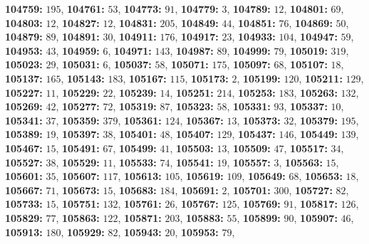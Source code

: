 \textsf{\bfseries 104759:} $195$, \textsf{\bfseries 104761:} $53$, \textsf{\bfseries 104773:} $91$, \textsf{\bfseries 104779:} $3$, \textsf{\bfseries 104789:} $12$, \textsf{\bfseries 104801:} $69$, \textsf{\bfseries 104803:} $12$, \textsf{\bfseries 104827:} $12$, \textsf{\bfseries 104831:} $205$, \textsf{\bfseries 104849:} $44$, \textsf{\bfseries 104851:} $76$, \textsf{\bfseries 104869:} $50$, \textsf{\bfseries 104879:} $89$, \textsf{\bfseries 104891:} $30$, \textsf{\bfseries 104911:} $176$, \textsf{\bfseries 104917:} $23$, \textsf{\bfseries 104933:} $104$, \textsf{\bfseries 104947:} $59$, \textsf{\bfseries 104953:} $43$, \textsf{\bfseries 104959:} $6$, \textsf{\bfseries 104971:} $143$, \textsf{\bfseries 104987:} $89$, \textsf{\bfseries 104999:} $79$, \textsf{\bfseries 105019:} $319$, \textsf{\bfseries 105023:} $29$, \textsf{\bfseries 105031:} $6$, \textsf{\bfseries 105037:} $58$, \textsf{\bfseries 105071:} $175$, \textsf{\bfseries 105097:} $68$, \textsf{\bfseries 105107:} $18$, \textsf{\bfseries 105137:} $165$, \textsf{\bfseries 105143:} $183$, \textsf{\bfseries 105167:} $115$, \textsf{\bfseries 105173:} $2$, \textsf{\bfseries 105199:} $120$, \textsf{\bfseries 105211:} $129$, \textsf{\bfseries 105227:} $11$, \textsf{\bfseries 105229:} $22$, \textsf{\bfseries 105239:} $14$, \textsf{\bfseries 105251:} $214$, \textsf{\bfseries 105253:} $183$, \textsf{\bfseries 105263:} $132$, \textsf{\bfseries 105269:} $42$, \textsf{\bfseries 105277:} $72$, \textsf{\bfseries 105319:} $87$, \textsf{\bfseries 105323:} $58$, \textsf{\bfseries 105331:} $93$, \textsf{\bfseries 105337:} $10$, \textsf{\bfseries 105341:} $37$, \textsf{\bfseries 105359:} $379$, \textsf{\bfseries 105361:} $124$, \textsf{\bfseries 105367:} $13$, \textsf{\bfseries 105373:} $32$, \textsf{\bfseries 105379:} $195$, \textsf{\bfseries 105389:} $19$, \textsf{\bfseries 105397:} $38$, \textsf{\bfseries 105401:} $48$, \textsf{\bfseries 105407:} $129$, \textsf{\bfseries 105437:} $146$, \textsf{\bfseries 105449:} $139$, \textsf{\bfseries 105467:} $15$, \textsf{\bfseries 105491:} $67$, \textsf{\bfseries 105499:} $41$, \textsf{\bfseries 105503:} $13$, \textsf{\bfseries 105509:} $47$, \textsf{\bfseries 105517:} $34$, \textsf{\bfseries 105527:} $38$, \textsf{\bfseries 105529:} $11$, \textsf{\bfseries 105533:} $74$, \textsf{\bfseries 105541:} $19$, \textsf{\bfseries 105557:} $3$, \textsf{\bfseries 105563:} $15$, \textsf{\bfseries 105601:} $35$, \textsf{\bfseries 105607:} $117$, \textsf{\bfseries 105613:} $105$, \textsf{\bfseries 105619:} $109$, \textsf{\bfseries 105649:} $68$, \textsf{\bfseries 105653:} $18$, \textsf{\bfseries 105667:} $71$, \textsf{\bfseries 105673:} $15$, \textsf{\bfseries 105683:} $184$, \textsf{\bfseries 105691:} $2$, \textsf{\bfseries 105701:} $300$, \textsf{\bfseries 105727:} $82$, \textsf{\bfseries 105733:} $15$, \textsf{\bfseries 105751:} $132$, \textsf{\bfseries 105761:} $26$, \textsf{\bfseries 105767:} $125$, \textsf{\bfseries 105769:} $91$, \textsf{\bfseries 105817:} $126$, \textsf{\bfseries 105829:} $77$, \textsf{\bfseries 105863:} $122$, \textsf{\bfseries 105871:} $203$, \textsf{\bfseries 105883:} $55$, \textsf{\bfseries 105899:} $90$, \textsf{\bfseries 105907:} $46$, \textsf{\bfseries 105913:} $180$, \textsf{\bfseries 105929:} $82$, \textsf{\bfseries 105943:} $20$, \textsf{\bfseries 105953:} $79$, 
